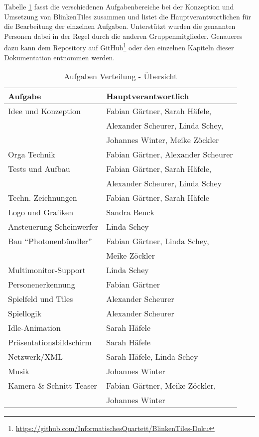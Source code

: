 
Tabelle \ref{tab:aufgaben} fasst die verschiedenen Aufgabenbereiche bei der Konzeption und Umsetzung von BlinkenTiles zusammen und listet die Hauptverantwortlichen für die Bearbeitung der einzelnen Aufgaben. Unterstützt wurden die genannten Personen dabei in der Regel durch die anderen Gruppenmitglieder. Genaueres dazu kann dem Repository auf GitHub\footnote{\url{https://github.com/InformatischesQuartett/BlinkenTiles-Doku}} oder den einzelnen Kapiteln dieser Dokumentation entnommen werden.

\vspace{0.8em}

\begin{table}[hc]
\begin{center}
\begin{tabular}[hc]{l|l}
\textbf{Aufgabe} & \textbf{Hauptverantwortlich}\\
\hline
Idee und Konzeption& Fabian Gärtner, Sarah Häfele,\\
&Alexander Scheurer, Linda Schey,\\
&Johannes Winter, Meike Zöckler\\\hline
Orga Technik& Fabian Gärtner, Alexander Scheurer\\\hline
Tests und Aufbau& Fabian Gärtner, Sarah Häfele,\\
&Alexander Scheurer, Linda Schey\\\hline
Techn. Zeichnungen& Fabian Gärtner, Sarah Häfele\\\hline
Logo und Grafiken& Sandra Beuck\\\hline
Ansteuerung Scheinwerfer&Linda Schey\\\hline
Bau \enquote{Photonenbündler}&Fabian Gärtner, Linda Schey,\\&Meike Zöckler\\\hline
Multimonitor-Support& Linda Schey\\\hline
Personenerkennung& Fabian Gärtner\\\hline
Spielfeld und Tiles& Alexander Scheurer\\\hline
Spiellogik& Alexander Scheurer\\\hline
Idle-Animation& Sarah Häfele\\\hline
Präsentationsbildschirm& Sarah Häfele\\\hline
Netzwerk/XML& Sarah Häfele, Linda Schey\\\hline
Musik& Johannes Winter\\\hline
Kamera \& Schnitt Teaser&Fabian Gärtner, Meike Zöckler,\\&Johannes Winter\\
\hline
\end{tabular}
\caption{Aufgaben Verteilung - Übersicht}
\label{tab:aufgaben}
\end{center}
\end{table}
